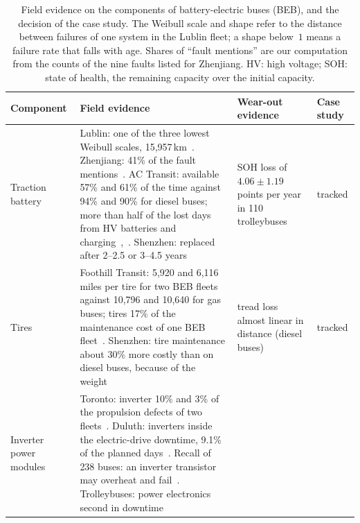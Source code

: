 \documentclass[11pt,a4paper]{article}
\theoremstyle{plain}
\theoremstyle{definition}
\theoremstyle{remark}
\begin{document}
\begin{table}[htbp]
\centering
\caption{Field evidence on the components of battery-electric buses (BEB), and the decision of the case study.
The Weibull scale and shape refer to the distance between failures of one system in the Lublin fleet; a shape below~$1$ means a failure rate that falls with age.
Shares of ``fault mentions'' are our computation from the counts of the nine faults listed for Zhenjiang.
HV: high voltage; SOH: state of health, the remaining capacity over the initial capacity.}
\label{tab:cs_focus}
\small
\begin{tabularx}{\linewidth}{@{}>{\hsize=0.624\hsize\raggedright\arraybackslash}X>{\hsize=1.986\hsize\raggedright\arraybackslash}X>{\hsize=1.021\hsize\raggedright\arraybackslash}X>{\hsize=0.369\hsize\raggedright\arraybackslash}X@{}}
\toprule
\rowcolor{headgrey}
\textbf{Component} & \textbf{Field evidence} & \textbf{Wear-out evidence} & \textbf{Case study} \\
\midrule
Traction battery
  & Lublin: one of the three lowest Weibull scales, 15,957\,km~\cite[Table~8]{Niewczas2025reliability}.
    Zhenjiang: 41\% of the fault mentions~\cite[Table~1, p.~9]{Nan2022fault}.
    AC Transit: available 57\% and 61\% of the time against 94\% and 90\% for diesel buses; more than half of the lost days from HV batteries and charging~\cite[p.~19]{ACTransit2021ZETBTA},~\cite[p.~19]{ACTransit2022ZETBTA}.
    Shenzhen: replaced after 2--2.5 or 3--4.5 years~\cite[p.~70]{WorldBank2021Shenzhen}
  & SOH loss of $4.06 \pm 1.19$ points per year in 110 trolleybuses~\cite[Table~9, p.~21]{Malozyomov2026trolleybus}
  & tracked \\[3pt]
Tires
  & Foothill Transit: 5,920 and 6,116 miles per tire for two BEB fleets against 10,796 and 10,640 for gas buses; tires 17\% of the maintenance cost of one BEB fleet~\cite[pp.~53,~78]{NREL2021Foothill}.
    Shenzhen: tire maintenance about 30\% more costly than on diesel buses, because of the weight~\cite[p.~68]{WorldBank2021Shenzhen}
  & tread loss almost linear in distance (diesel buses)~\cite[Sec.~3.1]{Giechaskiel2026bus}
  & tracked \\[3pt]
Inverter power modules
  & Toronto: inverter 10\% and 3\% of the propulsion defects of two fleets~\cite[Charts~6 and~8]{TTC2022}.
    Duluth: inverters inside the electric-drive downtime, 9.1\% of the planned days~\cite[Table~5]{NREL2022Duluth}.
    Recall of 238 buses: an inverter transistor may overheat and fail~\cite{NHTSA2023recall}.
    Trolleybuses: power electronics second in downtime~\cite[Fig.~12]{Malozyomov2026trolleybus}

\end{tabularx}
\end{table}
\end{document}
